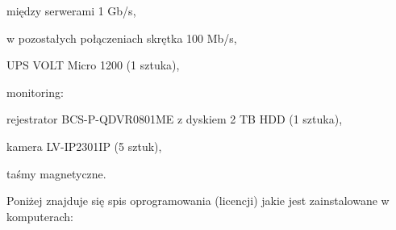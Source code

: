 \begin{minipage}[\right]{15cm}
\begin{itemize*}
\begin{itemize*}
		\item między serwerami 1 Gb/s,
		\item w pozostałych połączeniach skrętka 100 Mb/s,
	\end{itemize*}
	\item UPS VOLT Micro 1200 (1 sztuka),
	\item monitoring:
	\begin{itemize*}
		\item rejestrator BCS-P-QDVR0801ME z dyskiem 2 TB HDD (1 sztuka),
		\item kamera LV-IP2301IP (5 sztuk),
	\end{itemize*}
	\item taśmy magnetyczne.
\end{itemize*}
\end{minipage}

\newpage
Poniżej znajduje się spis oprogramowania (licencji) jakie jest \linebreak zainstalowane w komputerach:

